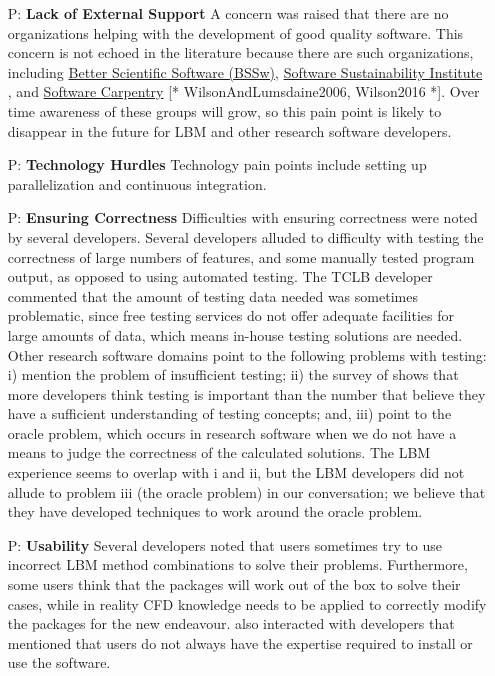 \documentclass[runningheads]{llncs}
\newcounter{pnum} %
\begin{document}
\begin{enumerate}
	\item[P\refstepcounter{pnum}\thepnum \label{P_LackExtSupport}:] \textbf{Lack
	of External Support} A concern was raised that there are no organizations
	helping with the development of good quality software.  This concern is not
	echoed in the literature because there are such organizations, including
	\href{https://bssw.io/} {Better Scientific Software (BSSw)},
	\href{https://www.software.ac.uk/} {Software Sustainability Institute}
	\cite{CrouchEtAl2013}, and \href{https://software-carpentry.org/}{Software
	Carpentry} [* {WilsonAndLumsdaine2006, Wilson2016} *]. Over time awareness of
	these groups will grow, so this pain point is likely to disappear in the
	future for LBM and other research software developers.
		
	\item[P\refstepcounter{pnum}\thepnum \label{P_TechnologyHurdles}:]
	\textbf{Technology Hurdles} Technology pain points include setting up
	parallelization and continuous integration.

	\item[P\refstepcounter{pnum}\thepnum \label{P_Correctness}:]
	\textbf{Ensuring Correctness} Difficulties with ensuring correctness were
	noted by several developers. Several developers alluded to difficulty with
	testing the correctness of large numbers of features, and some manually
	tested program output, as opposed to using automated testing. The TCLB
	developer commented that the amount of testing data needed was sometimes
	problematic, since free testing services do not offer adequate facilities
	for large amounts of data, which means in-house testing solutions are
	needed.  Other research software domains point to the following problems
	with testing: i) \cite{PintoEtAl2018} mention the problem of insufficient
	testing; ii) the survey of \cite{HannayEtAl2009} shows that more developers
	think testing is important than the number that believe they have a
	sufficient understanding of testing concepts; and, iii)
	\cite{HannayEtAl2009,KanewalaAndBieman2013,KellyEtAl2011,WieseEtAl2019}
	point to the oracle problem, which occurs in research software when we do
	not have a means to judge the correctness of the calculated solutions.  The
	LBM experience seems to overlap with i and ii, but the LBM developers did
	not allude to problem iii (the oracle problem) in our conversation; we
	believe that they have developed techniques to work around the oracle
	problem.  
	
	\item[P\refstepcounter{pnum}\thepnum \label{P_Usability}:]
	\textbf{Usability} Several developers noted that users sometimes try to use
	incorrect LBM method combinations to solve their problems. Furthermore, some
	users think that the packages will work out of the box to solve their cases,
	while in reality CFD knowledge needs to be applied to correctly modify the
	packages for the new endeavour.  \cite{WieseEtAl2019} also interacted with
	developers that mentioned that users do not always have the expertise
	required to install or use the software.
	

\end{enumerate}
\end{document}
